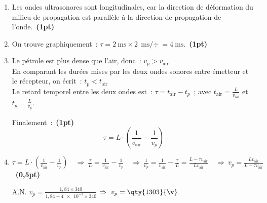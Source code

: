 \begin{enumerate}
    \item Les ondes ultrasonores sont longitudinales, car la direction de
          déformation du milieu de propagation est parallèle à la direction de
          propagation de l'onde.~\textbf{(1pt)}
    \item On trouve graphiquement~:
          $\tau=\qty{2}{\ms}\times\qty[per-mode=symbol]{2}{\ms\per\div}=
          \qty{4}{\ms}$.~\textbf{(1pt)}
    \item Le pétrole est plus dense que l'air, donc~: $v_{p} > v_{\text{air}}$\\
          En comparant les durées mises par les deux ondes sonores entre
          émetteur et le récepteur, on écrit~: $t_{p}<t_{\text{air}}$ \\
          Le retard temporel entre les deux ondes est~:
          $\tau=t_{\text{air}}-t_{p}$~; avec
          $t_{\text{air}}=\frac{L}{v_{\text{air}}}$ et $t_{p}=\frac{L}{v_{p}}$.
          
          Finalement~:~\textbf{(1pt)}
          \[
              \tau=L \cdot\left(\frac{1}{v_{\text{air}}}-\frac{1}{v_p}\right)
          \]
    \item $\tau=L \cdot\left(\frac{1}{v_{\text{air}}}-\frac{1}{v_p}\right)
          \quad\Rightarrow\
          \frac{\tau}{L}=\frac{1}{v_{\text{air}}}-\frac{1}{v_p}
          \quad\Rightarrow\
          \frac{1}{v_p}=\frac{1}{v_{\text{air}}}-\frac{\tau}{L}=
          \frac{L-\tau v_{\text{air}}}{Lv_{\text{air}}}
          \quad\Rightarrow\
          v_{p}=\frac{Lv_{\text{air}}}{L-\tau v_{\text{air}}}$~\textbf{(0,5pt)}

          A.N. $v_{p}=\frac{1,84\times 340}{1,84-\num{4e-3}\times 340}$
          \quad $\Rightarrow\ v_{p}=\qty{1303}{\v}$
\end{enumerate}

